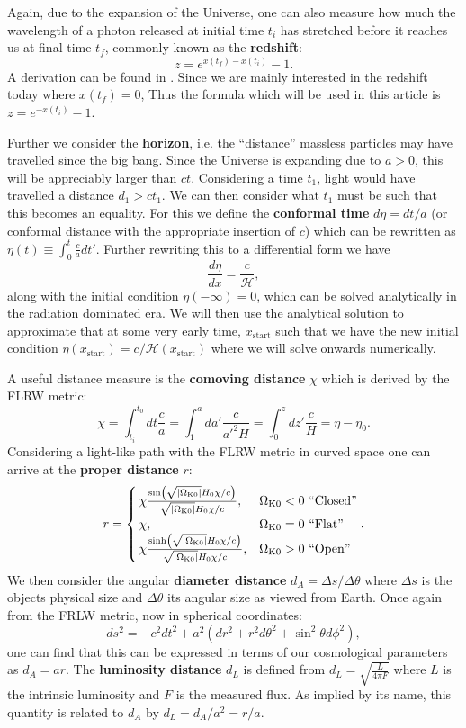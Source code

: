 \documentclass[%
reprint,
 amsmath,amssymb,
 aps,
]{revtex4-2}
\newcommand{\Hp}{\mathcal{H}}
\begin{document}
Again, due to the expansion of the Universe, one can also measure how much the wavelength of a photon released at initial time $t_i$ has stretched before it reaches us at final time $t_f$, commonly known as the \textbf{redshift}:
\[z=e^{x(t_f)-x(t_i)}-1.\]
A derivation can be found in \cite{Davis_2004}. Since we are mainly interested in the redshift today where $x(t_f)=0$, Thus the formula which will be used in this article is $z=e^{-x(t_i)}-1$.

Further we consider the \textbf{horizon}, i.e. the ``distance'' massless particles may have travelled since the big bang. Since the Universe is expanding due to $\dot a>0$, this will be appreciably larger than $ct$. Considering a time $t_1$, light would have travelled a distance $d_1>ct_1$. We can then consider what $t_1$ must be such that this becomes an equality. For this we define the \textbf{conformal time} $d\eta=dt/a$ (or conformal distance with the appropriate insertion of $c$) which can be rewritten as $\eta(t)\equiv\int_0^t\frac{c}{a}dt'$. Further rewriting this to a differential form we have
\begin{equation}
	\frac{d\eta}{dx}=\frac{c}{\Hp},\label{eq:detaODE}
\end{equation}
along with the initial condition $\eta(-\infty)=0$, which can be solved analytically in the radiation dominated era. We will then use the analytical solution to approximate that at some very early time, $x_\text{start}$ such that we have the new initial condition $\eta(x_\text{start})=c/\Hp(x_\text{start})$ where we will solve onwards numerically. 

A useful distance measure is the \textbf{comoving distance} $\chi$ which is derived by the FLRW metric:
\[\chi=\int_{t_i}^{t_0}dt\frac{c}{a}=\int_1^ada'\frac{c}{a'^2H}=\int_0^zdz'\frac{c}{H}=\eta-\eta_0.\]
Considering a light-like path with the FLRW metric in curved space one can arrive at the \textbf{proper distance} $r$:
\[
r=
\begin{cases}
	\,\chi\frac{\sin(\sqrt{\left|\Omega_{\text K0}\right|}H_0\chi/c)}{\sqrt{\left|\Omega_{\text K0}\right|}H_0\chi/c},& \Omega_{\text K0}<0~\text{``Closed''}\\
	\,\chi, & \Omega_{\text K0}=0~\text{``Flat''}\\
	\,\chi\frac{\sinh(\sqrt{\left|\Omega_{\text K0}\right|}H_0\chi/c)}{\sqrt{\left|\Omega_{\text K0}\right|}H_0\chi/c},& \Omega_{\text K0}>0~\text{``Open''}
\end{cases}.
\]
We then consider the angular \textbf{diameter distance} $d_A=\Delta s/\Delta \theta$ where $\Delta s$ is the objects physical size and $\Delta \theta$ its angular size as viewed from Earth. Once again from the FRLW metric, now in spherical coordinates:
\[ds^2=-c^2dt^2+a^2(dr^2+r^2d\theta^2+\sin^2\theta d\phi^2),\]
one can find that this can be expressed in terms of our cosmological parameters as $d_A=ar$. The \textbf{luminosity distance} $d_L$ is defined from $d_L=\sqrt{\frac{L}{4\pi F}}$ where $L$ is the intrinsic luminosity and $F$ is the measured flux. As implied by its name, this quantity is related to $d_A$ by $d_L=d_A/a^2=r/a$. 
\end{document}
